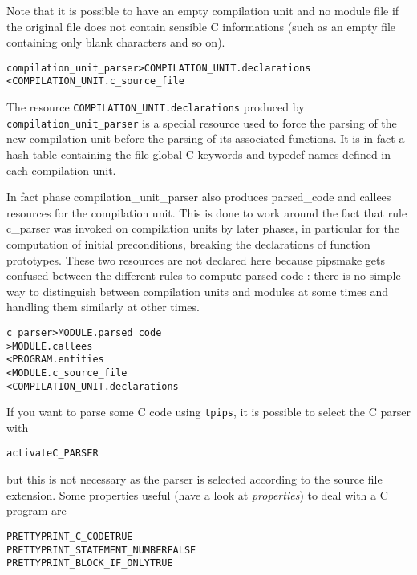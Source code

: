 \documentclass[a4paper]{report}
\newenvironment{PipsMake}{\begin{alltt}}{\end{alltt}}
\newenvironment{PipsPass}[1]{\label{pass:#1}}{}
\newcommand{\PROPERTIES}{{\em properties}}
\begin{document}
Note that it is possible to have an empty compilation unit and no module
file if the original file does not contain sensible C informations (such
as an empty file containing only blank characters and so on).

\begin{PipsMake}
compilation_unit_parser         > COMPILATION_UNIT.declarations
        < COMPILATION_UNIT.c_source_file
\end{PipsMake}

The resource \verb/COMPILATION_UNIT.declarations/ produced by
\texttt{compilation\_unit\_parser} is a special resource used to force the
parsing of the new compilation unit before the parsing of its associated
functions. It is in fact a hash table containing the file-global C
keywords and typedef names defined in each compilation unit.

In fact phase compilation\_unit\_parser also produces parsed\_code and
callees resources for the compilation unit. This is done to work
around the fact that rule c\_parser was invoked on compilation units
by later phases, in particular for the computation of initial
preconditions, breaking the declarations of function
prototypes. These two resources are not declared here because pipsmake
gets confused between the different rules to compute parsed code :
there is no simple way to distinguish between compilation units and
modules at some times and handling them similarly at other times.


\begin{PipsMake}
c_parser                        > MODULE.parsed_code
                                > MODULE.callees
        < PROGRAM.entities
        < MODULE.c_source_file
        < COMPILATION_UNIT.declarations
\end{PipsMake}

\begin{PipsPass}{c_parser}
If you want to parse some C code using \texttt{tpips}, it is possible to
select the C parser with
\begin{alltt}
activate C_PARSER
\end{alltt}
but this is not necessary as the parser is selected according to the
source file extension.
Some properties useful (have a look at \PROPERTIES) to deal with
a C program are
\begin{alltt}
PRETTYPRINT_C_CODE TRUE
PRETTYPRINT_STATEMENT_NUMBER FALSE
PRETTYPRINT_BLOCK_IF_ONLY TRUE
\end{alltt}
\end{PipsPass}
\end{document}
